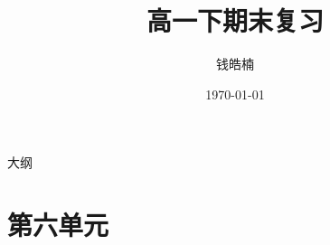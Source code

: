 \documentclass[handout,aspectratio=169]{ctexbeamer}
\begin{document}
\title{高一下期末复习}
\date{\today}
\author{钱皓楠}
\begin{frame}{}{}%
    \titlepage{}
\end{frame}

\begin{frame}{大纲}
  \tableofcontents
\end{frame}



% 
% 
\section{第六单元}

% 
% 
% 
% 
% 
\end{document}
